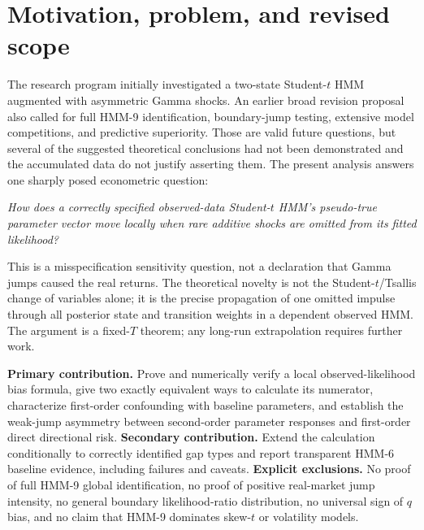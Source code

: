 \documentclass[11pt,a4paper]{article}
\begin{document}
\section{Motivation, problem, and revised scope}
The research program initially investigated a two-state Student-$t$ HMM augmented with asymmetric Gamma shocks. An earlier broad revision proposal also called for full HMM-9 identification, boundary-jump testing, extensive model competitions, and predictive superiority. Those are valid future questions, but several of the suggested theoretical conclusions had not been demonstrated and the accumulated data do not justify asserting them. The present analysis answers one sharply posed econometric question:

\emph{How does a correctly specified observed-data Student-$t$ HMM's pseudo-true parameter vector move locally when rare additive shocks are omitted from its fitted likelihood?}

This is a misspecification sensitivity question, not a declaration that Gamma jumps caused the real returns. The theoretical novelty is not the Student-$t$/Tsallis change of variables alone; it is the precise propagation of one omitted impulse through all posterior state and transition weights in a dependent observed HMM. The argument is a fixed-$T$ theorem; any long-run extrapolation requires further work.

\textbf{Primary contribution.} Prove and numerically verify a local observed-likelihood bias formula, give two exactly equivalent ways to calculate its numerator, characterize first-order confounding with baseline parameters, and establish the weak-jump asymmetry between second-order parameter responses and first-order direct directional risk. \textbf{Secondary contribution.} Extend the calculation conditionally to correctly identified gap types and report transparent HMM-6 baseline evidence, including failures and caveats. \textbf{Explicit exclusions.} No proof of full HMM-9 global identification, no proof of positive real-market jump intensity, no general boundary likelihood-ratio distribution, no universal sign of $q$ bias, and no claim that HMM-9 dominates skew-$t$ or volatility models.
\end{document}
